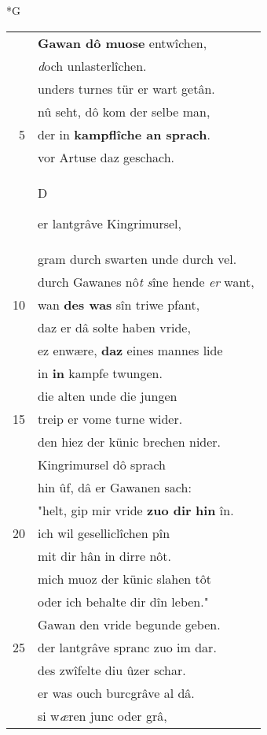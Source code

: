 \documentclass[8pt,a4paper,notitlepage]{article}
\begin{document}
\begin{table}[ht]
\begin{minipage}[t]{0.5\linewidth}
\small
\begin{center}*G
\end{center}
\begin{tabular}{rl}
 & \textbf{Gawan dô muose} entwîchen,\\ 
 & \textit{d}och unlasterlîchen.\\ 
 & unders turnes tür er wart getân.\\ 
 & nû seht, dô kom der selbe man,\\ 
5 & der in \textbf{kampflîche an sprach}.\\ 
 & vor Artuse daz geschach.\\ 
 & \begin{large}D\end{large}er lantgrâve Kingrimursel,\\ 
 & gram durch swarten unde durch vel.\\ 
 & durch Gawanes nô\textit{t} \textit{s}îne hende \textit{er} want,\\ 
10 & wan \textbf{des was} sîn triwe pfant,\\ 
 & daz er dâ solte haben vride,\\ 
 & ez enwære, \textbf{daz} eines mannes lide\\ 
 & in \textbf{in} kampfe twungen.\\ 
 & die alten unde die jungen\\ 
15 & treip er vome turne wider.\\ 
 & den hiez der künic brechen nider.\\ 
 & Kingrimursel dô sprach\\ 
 & hin ûf, dâ er Gawanen sach:\\ 
 & "helt, gip mir vride \textbf{zuo dir} \textbf{hin} în.\\ 
20 & ich wil geselliclîchen pîn\\ 
 & mit dir hân in dirre nôt.\\ 
 & mich muoz der künic slahen tôt\\ 
 & oder ich behalte dir dîn leben."\\ 
 & Gawan den vride begunde geben.\\ 
25 & der lantgrâve spranc zuo im dar.\\ 
 & des zwîfelte diu ûzer schar.\\ 
 & er was ouch burcgrâve al dâ.\\ 
 & si w\textit{æ}ren junc oder grâ,\\ 

\end{tabular}
\end{minipage}
\end{table}
\end{document}

